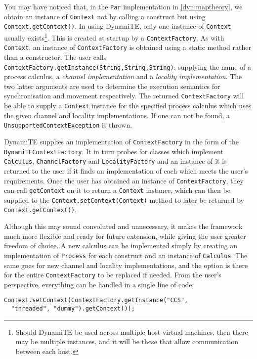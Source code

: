 You may have noticed that, in the \texttt{Par} implementation in
\ref{dyn:maptheory}, we obtain an instance of \texttt{Context} not by
calling a construct but using \texttt{Context.getContext()}.  In using
DynamiTE, only one instance of \texttt{Context} usually
exists\footnote{Should DynamiTE be used across multiple host virtual
  machines, then there may be multiple instances, and it will be these
  that allow communication between each host.}.  This is created at
startup by a \texttt{ContextFactory}.  As with \texttt{Context}, an
instance of \texttt{ContextFactory} is obtained using a static method
rather than a constructor.  The user calls
\texttt{ContextFactory.getInstance(String,String,String)}, supplying
the name of a process calculus, a \emph{channel implementation} and a
\emph{locality implementation}.  The two latter arguments are used to
determine the execution semantics for synchronisation and movement
respectively.  The returned \texttt{ContextFactory} will be able to
supply a \texttt{Context} instance for the specified process calculus
which uses the given channel and locality implementations.  If one can
not be found, a \texttt{UnsupportedContextException} is thrown.

DynamiTE supplies an implementation of \texttt{ContextFactory} in the
form of the \texttt{DynamiTEContextFactory}.  It in turn probes for
classes which implement \texttt{Calculus}, \texttt{ChannelFactory} and
\texttt{LocalityFactory} and an instance of it is returned to the user
if it finds an implementation of each which meets the user's
requirements.  Once the user has obtained an instance of
\texttt{ContextFactory}, they can call \texttt{getContext} on it to
return a \texttt{Context} instance, which can then be supplied to the
\texttt{Context.setContext(Context)} method to later be returned by
\texttt{Context.getContext()}.

Although this may sound convoluted and unnecessary, it makes the
framework much more flexible and ready for future extension, while
giving the user greater freedom of choice.  A new calculus can be
implemented simply by creating an implementation of \texttt{Process}
for each construct and an instance of \texttt{Calculus}.  The same
goes for new channel and locality implementations, and the option is
there for the entire \texttt{ContextFactory} to be replaced if needed.
From the user's perspective, everything can be handled in a single
line of code:

\begin{verbatim}
Context.setContext(ContextFactory.getInstance("CCS",
  "threaded", "dummy").getContext());
\end{verbatim}

